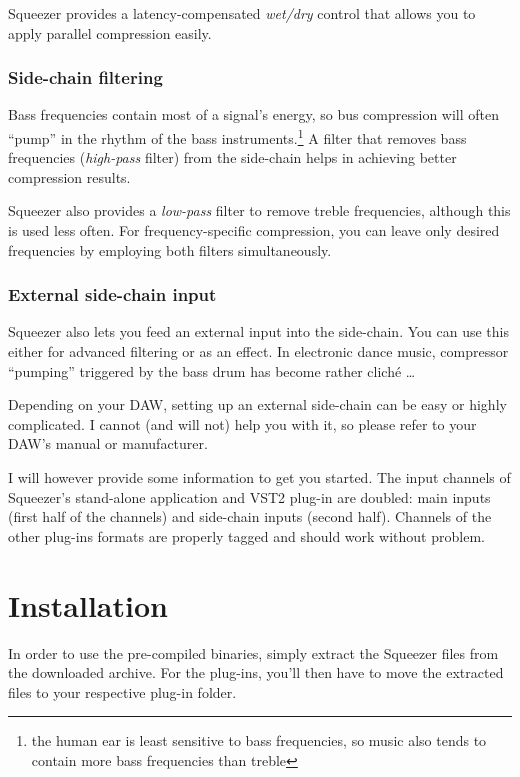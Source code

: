 Squeezer provides a latency-compensated \emph{wet/dry} control that
allows you to apply parallel compression easily.

\subsection{Side-chain filtering}
\label{sec:side_chain_filtering}

Bass frequencies contain most of a signal's energy, so bus compression
will often ``pump'' in the rhythm of the bass
instruments.\footnote{the human ear is least sensitive to bass
  frequencies, so music also tends to contain more bass frequencies
  than treble} A filter that removes bass frequencies
(\emph{high-pass} filter) from the side-chain helps in achieving
better compression results.

Squeezer also provides a \emph{low-pass} filter to remove treble
frequencies, although this is used less often.  For frequency-specific
compression, you can leave only desired frequencies by employing both
filters simultaneously.

\subsection{External side-chain input}
\label{sec:external_side_chain}

Squeezer also lets you feed an external input into the side-chain.
You can use this either for advanced filtering or as an effect.  In
electronic dance music, compressor ``pumping'' triggered by the bass
drum has become rather cliché \dots

Depending on your DAW, setting up an external side-chain can be easy
or highly complicated.  I cannot (and will not) help you with it, so
please refer to your DAW's manual or manufacturer.

I will however provide some information to get you started.  The input
channels of Squeezer's stand-alone application and VST2 plug-in are
doubled: main inputs (first half of the channels) and side-chain
inputs (second half).  Channels of the other plug-ins formats are
properly tagged and should work without problem.

\chapter{Installation}
\label{chap:installation}

In order to use the pre-compiled binaries, simply extract the Squeezer
files from the downloaded archive.  For the plug-ins, you'll then have
to move the extracted files to your respective plug-in folder.

